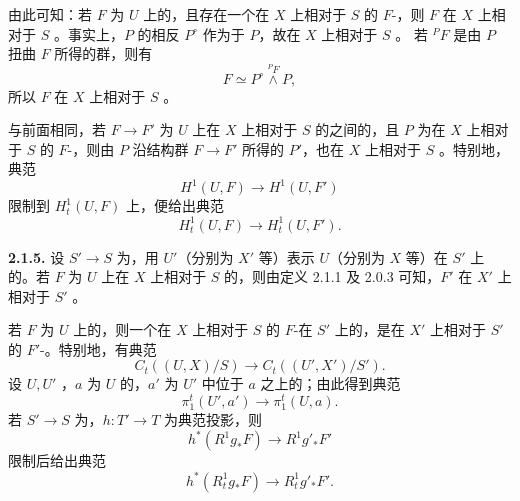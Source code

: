 由此可知：若 $F$ 为 $U$ 上的，且存在一个在 $X$ 上相对于 $S$ 的 $F$-，则 $F$ 在 $X$ 上相对于 $S$ 。事实上，$P$ 的相反 $P^\circ$ 作为于 $P$，故在 $X$ 上相对于 $S$ 。
若 ${}^PF$ 是由 $P$ 扭曲 $F$ 所得的群，则有
\[F\simeq P^\circ\overset{{}^PF}{\wedge}P,\]
所以 $F$ 在 $X$ 上相对于 $S$ 。

与前面相同，若 $F\to F'$ 为 $U$ 上在 $X$ 上相对于 $S$ 的之间的，且 $P$ 为在 $X$ 上相对于 $S$ 的 $F$-，则由 $P$ 沿结构群 $F\to F'$ 所得的 $P'$，也在 $X$ 上相对于 $S$ 。特别地，典范
\[H^1(U,F)\longrightarrow H^1(U,F')\]
限制到 $H^1_t(U,F)$ 上，便给出典范
\[H^1_t(U,F)\longrightarrow H^1_t(U,F').\]

\textbf{2.1.5.} 设 $S'\to S$ 为，用 $U'$（分别为 $X'$ 等）表示 $U$（分别为 $X$ 等）在 $S'$ 上的。若 $F$ 为 $U$ 上在 $X$ 上相对于 $S$ 的，则由定义 2.1.1 及 2.0.3 可知，$F'$ 在 $X'$ 上相对于 $S'$ 。

若 $F$ 为 $U$ 上的，则一个在 $X$ 上相对于 $S$ 的 $F$-在 $S'$ 上的，是在 $X'$ 上相对于 $S'$ 的 $F'$-。特别地，有典范
\[C_t((U,X)/S)\longrightarrow C_t((U',X')/S').\tag{2.1.5.1}\]
设 $U,U'$ ，$a$ 为 $U$ 的，$a'$ 为 $U'$ 中位于 $a$ 之上的；由此得到典范
\[\pi_1^t(U',a')\longrightarrow\pi_1^t(U,a).\tag{2.1.5.2}\]
若 $S'\to S$ 为，$h:T'\to T$ 为典范投影，则
\[h^*(R^1g_*F)\longrightarrow R^1g'_*F'\]
限制后给出典范
\[h^*(R^1_tg_*F)\longrightarrow R^1_tg'_*F'.\tag{2.1.5.3}\]


